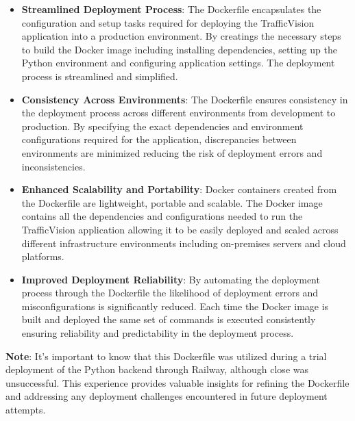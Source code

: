 \begin{itemize}
    \item \textbf{Streamlined Deployment Process}: The Dockerfile encapsulates the configuration and setup tasks required for deploying the TrafficVision application into a production environment. By creatings the necessary steps to build the Docker image including installing dependencies, setting up the Python environment and configuring application settings. The deployment process is streamlined and simplified.
    
    \item \textbf{Consistency Across Environments}: The Dockerfile ensures consistency in the deployment process across different environments from development to production. By specifying the exact dependencies and environment configurations required for the application, discrepancies between environments are minimized reducing the risk of deployment errors and inconsistencies.
    
    \item \textbf{Enhanced Scalability and Portability}: Docker containers created from the Dockerfile are lightweight, portable and scalable. The Docker image contains all the dependencies and configurations needed to run the TrafficVision application allowing it to be easily deployed and scaled across different infrastructure environments including on-premises servers and cloud platforms.
    
    \item \textbf{Improved Deployment Reliability}: By automating the deployment process through the Dockerfile the likelihood of deployment errors and misconfigurations is significantly reduced. Each time the Docker image is built and deployed the same set of commands is executed consistently ensuring reliability and predictability in the deployment process.
\end{itemize}

\textbf{Note}: It's important to know that this Dockerfile was utilized during a trial deployment of the Python backend through Railway, although close was unsuccessful. This experience provides valuable insights for refining the Dockerfile and addressing any deployment challenges encountered in future deployment attempts.